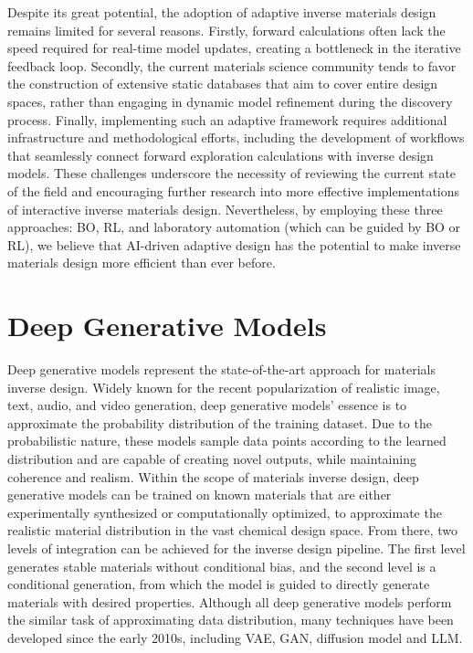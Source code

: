 \documentclass[fleqn,10pt]{wlscirep}
\begin{document}
Despite its great potential, the adoption of adaptive inverse materials design remains limited for several reasons. Firstly, forward calculations often lack the speed required for real-time model updates, creating a bottleneck in the iterative feedback loop. Secondly, the current materials science community tends to favor the construction of extensive static databases that aim to cover entire design spaces, rather than engaging in dynamic model refinement during the discovery process. Finally, implementing such an adaptive framework requires additional infrastructure and methodological efforts, including the development of workflows that seamlessly connect forward exploration calculations with inverse design models. These challenges underscore the necessity of reviewing the current state of the field and encouraging further research into more effective implementations of interactive inverse materials design.
Nevertheless, by employing these three approaches: BO, RL, and laboratory automation (which can be guided by BO or RL), we believe that AI-driven adaptive design has the potential to make inverse materials design more efficient than ever before.



\section{Deep Generative Models}
Deep generative models represent the state-of-the-art approach for materials inverse design.
Widely known for the recent popularization of realistic image, text, audio, and video generation, deep generative models' essence is to approximate the probability distribution of the training dataset. Due to the probabilistic nature, these models sample data points according to the learned distribution and are capable of creating novel outputs, while maintaining coherence and realism. Within the scope of materials inverse design, deep generative models can be trained on known materials that are either experimentally synthesized or computationally optimized, to approximate the realistic material distribution in the vast chemical design space. From there, two levels of integration can be achieved for the inverse design pipeline.  
The first level generates stable materials without conditional bias, and the second level is a conditional generation, from which the model is guided to directly generate materials with desired properties. Although all deep generative models perform the similar task of approximating data distribution, many techniques have been developed since the early 2010s, including VAE, GAN, diffusion model and LLM.
\end{document}
